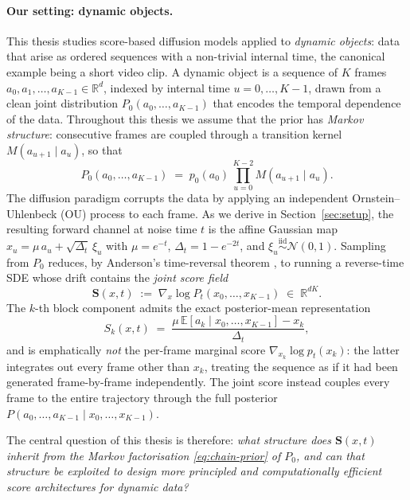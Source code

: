 \documentclass[11pt]{article}
\theoremstyle{definition}
\newcommand{\R}{\mathbb{R}}
\newcommand{\E}{\mathbb{E}}
\newcommand{\Detl}{\Delta_t}
\begin{document}
\paragraph{Our setting: dynamic objects.} This thesis studies
score-based diffusion models applied to \emph{dynamic objects}: data
that arise as ordered sequences with a non-trivial internal time, the
canonical example being a short video clip. A dynamic object is a
sequence of \(K\) frames \(a_0, a_1, \dots, a_{K-1} \in \R^d\), indexed by
internal time \(u = 0, \dots, K-1\), drawn from a clean joint distribution
\(P_0(a_0, \dots, a_{K-1})\) that encodes the temporal dependence of the
data. Throughout this thesis we assume that the prior has \emph{Markov
structure}: consecutive frames are coupled through a transition kernel
\(M(a_{u+1} \mid a_u)\), so that
\begin{equation}\label{eq:chain-prior}
    P_0(a_0, \dots, a_{K-1})
    \;=\;
    p_0(a_0)\, \prod_{u=0}^{K-2} M(a_{u+1} \mid a_u).
\end{equation}
The diffusion paradigm corrupts the data by applying an independent
Ornstein--Uhlenbeck (OU) process to each frame. As we derive in
Section~\ref{sec:setup}, the resulting forward channel at noise time \(t\)
is the affine Gaussian map
\(x_u = \mu\, a_u + \sqrt{\Detl}\, \xi_u\) with
\(\mu = e^{-t}\), \(\Detl = 1 - e^{-2t}\), and
\(\xi_u \stackrel{\text{iid}}{\sim} \mathcal N(0, 1)\). Sampling from
\(P_0\) reduces, by Anderson's time-reversal theorem
\citep{Anderson1982, HaussmannPardoux1986}, to running a
reverse-time SDE whose drift contains the \emph{joint score field}
\begin{equation}\label{eq:joint-score-def}
    \mathbf S(x, t)
    \;:=\;
    \nabla_x \log P_t(x_0, \dots, x_{K-1})
    \;\in\; \R^{dK}.
\end{equation}
The \(k\)-th block component admits the exact posterior-mean representation
\begin{equation}\label{eq:tweedie-preview}
    S_k(x, t)
    \;=\;
    \frac{\mu\, \E[a_k \mid x_0, \dots, x_{K-1}] - x_k}{\Detl},
\end{equation}
and is emphatically \emph{not} the per-frame marginal score
\(\nabla_{x_k} \log p_t(x_k)\): the latter integrates out every frame
other than \(x_k\), treating the sequence as if it had been generated
frame-by-frame independently. The joint score instead couples every
frame to the entire trajectory through the full posterior
\(P(a_0, \dots, a_{K-1} \mid x_0, \dots, x_{K-1})\).

The central question of this thesis is therefore: \emph{what structure
does \(\mathbf S(x, t)\) inherit from the Markov factorisation
\eqref{eq:chain-prior} of \(P_0\), and can that structure be exploited
to design more principled and computationally efficient score
architectures for dynamic data?}
\end{document}
